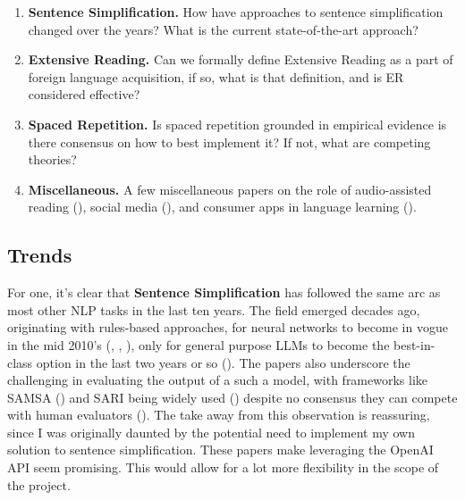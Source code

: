 \documentclass[
	letterpaper, %
]{jdf}
\begin{document}
\begin{enumerate}
    \item \textbf{Sentence Simplification.} How have approaches to sentence simplification changed over the years? What is the current state-of-the-art approach?
    \item \textbf{Extensive Reading.} Can we formally define Extensive Reading as a part of foreign language acquisition, if so, what is that definition, and is ER considered effective?
    \item \textbf{Spaced Repetition.} Is spaced repetition grounded in empirical evidence is there consensus on how to best implement it? If not, what are competing theories?
    \item \textbf{Miscellaneous.} A few miscellaneous papers on the role of audio-assisted reading (\cite{Chang2015ImprovingRR}), social media (\cite{Liu2015AnAO}), and consumer apps in language learning (\cite{karasimos2022battle}).
\end{enumerate}

\subsection{Trends}

For one, it's clear that \textbf{Sentence Simplification} has followed the same arc as most other NLP tasks in the last ten years. The field emerged decades ago, originating with rules-based approaches, for neural networks to become in vogue in the mid 2010's (\cite{xu-etal-2016-optimizing}, \cite{stajner-2021-automatic}, \cite{zhang2017sentence}), only for general purpose LLMs to become the best-in-class option in the last two years or so (\cite{feng2023sentence}). The papers also underscore the challenging in evaluating the output of a such a model, with frameworks like SAMSA (\cite{sulem-etal-2018-semantic}) and SARI being widely used (\cite{kew2023bless}) despite no consensus they can compete with human evaluators (\cite{wu2024indepth}). The take away from this observation is reassuring, since I was originally daunted by the potential need to implement my own solution to sentence simplification. These papers make leveraging the OpenAI API seem promising. This would allow for a lot more flexibility in the scope of the project.
\end{document}
